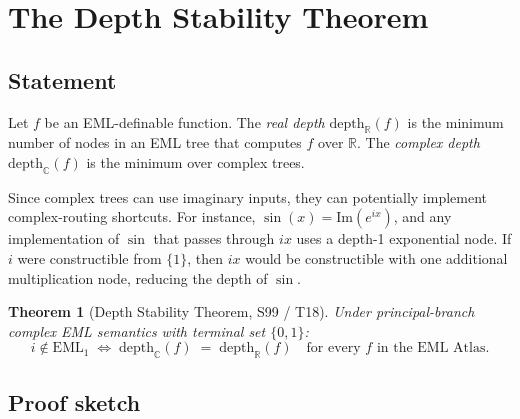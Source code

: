\documentclass[11pt]{article}
\newtheorem{theorem}{Theorem}[section]
\begin{document}
\section{The Depth Stability Theorem}

\subsection{Statement}

Let $f$ be an EML-definable function.  The \emph{real depth} $\mathrm{depth}_\mathbb{R}(f)$
is the minimum number of nodes in an EML tree that computes $f$ over $\mathbb{R}$.
The \emph{complex depth} $\mathrm{depth}_\mathbb{C}(f)$ is the minimum over complex trees.

Since complex trees can use imaginary inputs, they can potentially implement
complex-routing shortcuts.  For instance, $\sin(x) = \mathrm{Im}(e^{ix})$, and
any implementation of $\sin$ that passes through $ix$ uses a depth-1 exponential
node.  If $i$ were constructible from $\{1\}$, then $ix$ would be constructible
with one additional multiplication node, reducing the depth of $\sin$.

\begin{theorem}[Depth Stability Theorem, S99 / T18]
\label{thm:dst}
Under principal-branch complex EML semantics with terminal set $\{0, 1\}$:
\[
  i \notin \mathrm{EML}_1
  \;\iff\;
  \mathrm{depth}_\mathbb{C}(f) \;=\; \mathrm{depth}_\mathbb{R}(f)
  \quad \text{for every } f \text{ in the EML Atlas.}
\]
\end{theorem}

\subsection{Proof sketch}
\end{document}
